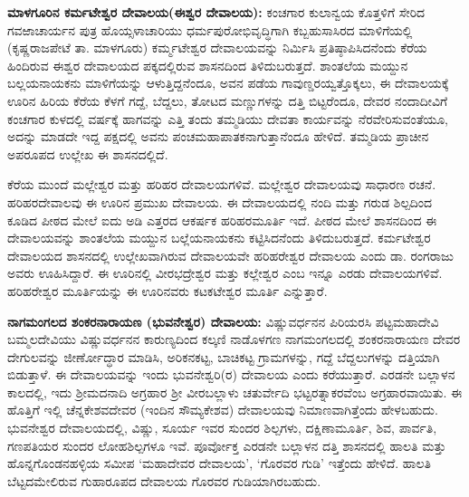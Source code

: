 \textbf{ಮಾಳಗೂರಿನ ಕರ್ಮಟೇಶ್ವರ ದೇವಾಲಯ(ಈಶ್ವರ ದೇವಾಲಯ):} ಕಂಚಗಾರ ಕುಲಾನ್ವಯ ಕೊತ್ತಳಿಗೆ ಸೇರಿದ ಗವಱಾಚಾರ್ಯನ ಪುತ್ರ ಹೊಯ್ಸಳಾಚಾರಿಯು ಧರ್ಮಪುರೋಭಿವೃದ್ಧಿಗಾಗಿ ಕಬ್ಬಹುಸಾಸಿರದ ಮಾಳಿಗೆಯಲ್ಲಿ (ಕೃಷ್ಣರಾಜಪೇಟೆ ತಾ. ಮಾಳಗೂರು) ಕರ್ಮ್ಮಟೇಶ್ವರ ದೇವಾಲಯವನ್ನು ನಿರ್ಮಿಸಿ ಪ್ರತಿಷ್ಠಾಪಿಸಿದನೆಂದು ಕೆರೆಯ ಹಿಂದಿರುವ ಈಶ್ವರ ದೇವಾಲಯದ ಪಕ್ಕದಲ್ಲಿರುವ ಶಾಸನದಿಂದ ತಿಳಿದುಬರುತ್ತದೆ. ಶಾಂತಲೆಯ ಮಯ್ದುನ ಬಲ್ಲಯನಾಯಕನು ಮಾಳಿಗೆಯನ್ನು ಆಳುತ್ತಿದ್ದನೆಂದೂ, ಅವನ ಪಡೆಯ ಗಾವುಣ್ಡರಯ್ವತ್ತೊಕ್ಕಲು, ಈ ದೇವಾಲಯಕ್ಕೆ ಊರಿನ ಹಿರಿಯ ಕೆರೆಯ ಕೆಳಗೆ ಗದ್ದೆ, ಬೆದ್ದಲು, ತೋಟದ ಮಣ್ಣುಗಳನ್ನು ದತ್ತಿ ಬಿಟ್ಟರೆಂದೂ, ದೇವರ ನಂದಾದೀವಿಗೆ ಕಂಚಗಾರ ಕುಳದಲ್ಲಿ ವರ್ಷಕ್ಕೆ ಹಾಗವನ್ನು ಎತ್ತಿ ತಂದು ತಮ್ಮಡಿಯು ದೇವತಾ ಕಾರ್ಯವನ್ನು ನೆರವೇರಿಸುವಂತೆಯೂ, ಅದನ್ನು ಮಾಡದೇ ಇದ್ದ ಪಕ್ಷದಲ್ಲಿ ಅವನು ಪಂಚಮಹಾಪಾತಕನಾಗುತ್ತಾನೆಂದೂ ಹೇಳಿದೆ. ತಮ್ಮಡಿಯ ಪ್ರಾಚೀನ ಅಪರೂಪದ ಉಲ್ಲೇಖ ಈ ಶಾಸನದಲ್ಲಿದೆ.

ಕೆರೆಯ ಮುಂದೆ ಮಲ್ಲೇಶ್ವರ ಮತ್ತು ಹರಿಹರ ದೇವಾಲಯಗಳಿವೆ. ಮಲ್ಲೇಶ್ವರ ದೇವಾಲಯವು ಸಾಧಾರಣ ರಚನೆ. ಹರಿಹರದೇವಾಲವು ಈ ಊರಿನ ಪ್ರಮುಖ ದೇವಾಲಯ. ಈ ದೇವಾಲಯದಲ್ಲಿ ನಂದಿ ಮತ್ತು ಗರುಡ ಶಿಲ್ಪದಿಂದ ಕೂಡಿದ ಪೀಠದ ಮೇಲೆ ಐದು ಅಡಿ ಎತ್ತರದ ಆಕರ್ಷಕ ಹರಿಹರಮೂರ್ತಿ ಇದೆ. ಪೀಠದ ಮೇಲೆ ಶಾಸನದಿಂದ ಈ ದೇವಾಲಯವನ್ನು ಶಾಂತಲೆಯ ಮಯ್ದುನ ಬಲ್ಲೆಯನಾಯಕನು ಕಟ್ಟಿಸಿದನೆಂದು ತಿಳಿದುಬರುತ್ತದೆ. ಕರ್ಮಟೇಶ್ವರ ದೇವಾಲಯದ ಶಾಸನದಲ್ಲಿ ಉಲ್ಲೇಖವಾಗಿರುವ ದೇವಾಲಯವೇ ಹರಿಹರೇಶ್ವರ ದೇವಾಲಯ ಎಂದು ಡಾ. ರಂಗರಾಜು ಅವರು ಊಹಿಸಿದ್ದಾರೆ. ಈ ಊರಿನಲ್ಲಿ ವೀರಭದ್ರೇಶ್ವರ ಮತ್ತು ಕಲ್ಲೇಶ್ವರ ಎಂಬ ಇನ್ನೂ ಎರಡು ದೇವಾಲಯಗಳಿವೆ. ಹರಿಹರೇಶ್ವರ ಮೂರ್ತಿಯನ್ನು ಈ ಊರಿನವರು ಕಟಕಟೇಶ್ವರ ಮೂರ್ತಿ ಎನ್ನುತ್ತಾರೆ.

\textbf{ನಾಗಮಂಗಲದ ಶಂಕರನಾರಾಯಣ (ಭುವನೇಶ್ವರ) ದೇವಾಲಯ:} ವಿಷ್ಣುವರ್ಧನನ ಪಿರಿಯರಸಿ ಪಟ್ಟಮಹಾದೇವಿ ಬಮ್ಮಲದೇವಿಯು ವಿಷ್ಣುವರ್ಧನನ ಕಾರುಣ್ಯದಿಂದ ಕಲ್ಕಣಿ ನಾಡೊಳಗಣ ನಾಗಮಂಗಲದಲ್ಲಿ ಶಂಕರನಾರಾಯಣ ದೇವರ ದೇಗುಲವನ್ನು ಜೀರ್ಣೋದ್ಧಾರ ಮಾಡಿಸಿ, ಅರಿಕನಕಟ್ಟ, ಬಾಚಿಕಟ್ಟ ಗ್ರಾಮಗಳನ್ನು, ಗದ್ದೆ ಬೆದ್ದಲುಗಳನ್ನು ದತ್ತಿಯಾಗಿ ಬಿಡುತ್ತಾಳೆ. ಈ ದೇವಾಲಯವನ್ನು ಇಂದು ಭುವನೇಶ್ವರಿ(ರ) ದೇವಾಲಯ ಎಂದು ಕರೆಯುತ್ತಾರೆ. ಎರಡನೇ ಬಲ್ಲಾಳನ ಕಾಲದಲ್ಲಿ, ಇದು ಶ‍್ರೀಮದನಾದಿ ಅಗ್ರಹಾರ ಶ‍್ರೀ ವೀರಬಲ್ಲಾಳು ಚತುರ್ವೇದಿ ಭಟ್ಟರತ್ನಾಕರವೆಂಬ ಅಗ್ರಹಾರವಾಯಿತು. ಈ ಹೊತ್ತಿಗೆ ಇಲ್ಲಿ ಚೆನ್ನಕೇಶವದೇವರ (ಇಂದಿನ ಸೌಮ್ಯಕೇಶವ) ದೇವಾಲಯವು ನಿಮಾಣವಾಗಿತ್ತೆಂದು ಹೇಳಬಹುದು. \hbox{ಭುವನೇಶ್ವರ} ದೇವಾಲಯದಲ್ಲಿ, ವಿಷ್ಣು, ಸೂರ್ಯ ಇವರ ಸುಂದರ ಶಿಲ್ಪಗಳು, ದಕ್ಷಿಣಾಮೂರ್ತಿ, ಶಿವ, ಪಾರ್ವತಿ, ಗಣಪತಿಯರ ಸುಂದರ ಲೋಹಶಿಲ್ಪಗಳೂ ಇವೆ. ಪೂರ್ವೋಕ್ತ ಎರಡನೇ ಬಲ್ಲಾಳನ ದತ್ತಿ ಶಾಸನದಲ್ಲಿ ಹಾಲತಿ ಮತ್ತು ಹೊನ್ನಗೊಂಡನಹಳ್ಳಿಯ ಸಮೀಪ ‘ಮಹಾದೇವರ ದೇವಾಲಯ’, ‘ಗೊರವರ ಗುಡಿ’ ಇತ್ತೆಂದು ಹೇಳಿದೆ. ಹಾಲತಿ ಬೆಟ್ಟದಮೇಲಿರುವ ಗುಹಾರೂಪದ ದೇವಾಲಯ ಗೊರವರ ಗುಡಿಯಾಗಿರಬಹುದು.

